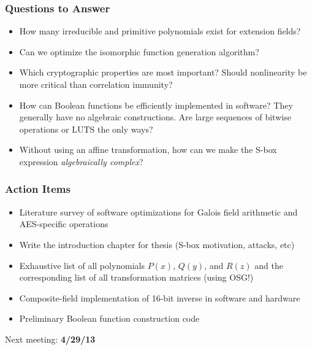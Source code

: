 \documentclass[handout]{beamer}
\begin{document}
\begin{frame}
	\frametitle{Questions to Answer}
	\begin{itemize}
		\item How many irreducible and primitive polynomials exist for extension fields?
		\item Can we optimize the isomorphic function generation algorithm?
		\item Which cryptographic properties are most important? Should nonlinearity be more critical than correlation immunity?
		\item How can Boolean functions be efficiently implemented in software? They generally have no algebraic constructions. Are large sequences of bitwise operations or LUTS the only ways?
		\item Without using an affine transformation, how can we make the S-box expression \emph{algebraically complex}?
	\end{itemize}
\end{frame}

\begin{frame}
	\frametitle{Action Items}
	\begin{itemize}
		\item Literature survey of software optimizations for Galois field arithmetic and AES-specific operations
		\item Write the introduction chapter for thesis (S-box motivation, attacks, etc)
		\item Exhaustive list of all polynomials $P(x)$, $Q(y)$, and $R(z)$ and the 
		corresponding list of all transformation matrices (using OSG!)
		\item Composite-field implementation of 16-bit inverse in software and hardware
		\item Preliminary Boolean function construction code
	\end{itemize}
	\begin{center}
		Next meeting: \textbf{4/29/13}
	\end{center}
\end{frame}
\end{document}
